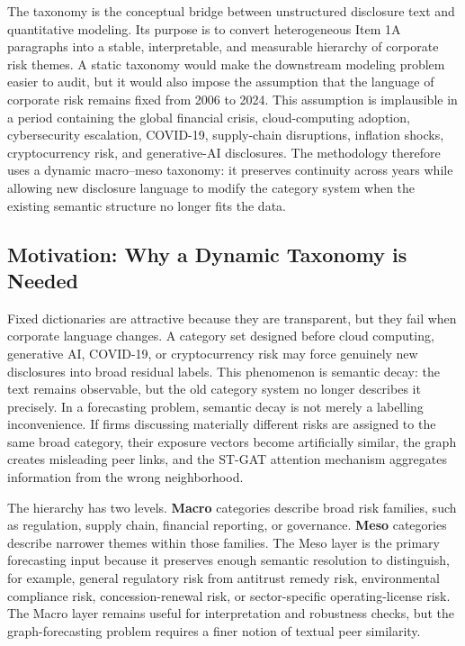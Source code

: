\documentclass[11pt, a4paper]{article}
\begin{document}
The taxonomy is the conceptual bridge between unstructured disclosure text and quantitative modeling. Its purpose is to convert heterogeneous Item 1A paragraphs into a stable, interpretable, and measurable hierarchy of corporate risk themes. A static taxonomy would make the downstream modeling problem easier to audit, but it would also impose the assumption that the language of corporate risk remains fixed from 2006 to 2024. This assumption is implausible in a period containing the global financial crisis, cloud-computing adoption, cybersecurity escalation, COVID-19, supply-chain disruptions, inflation shocks, cryptocurrency risk, and generative-AI disclosures. The methodology therefore uses a dynamic macro--meso taxonomy: it preserves continuity across years while allowing new disclosure language to modify the category system when the existing semantic structure no longer fits the data.

\subsection{Motivation: Why a Dynamic Taxonomy is Needed}
Fixed dictionaries are attractive because they are transparent, but they fail when corporate language changes. A category set designed before cloud computing, generative AI, COVID-19, or cryptocurrency risk may force genuinely new disclosures into broad residual labels. This phenomenon is semantic decay: the text remains observable, but the old category system no longer describes it precisely. In a forecasting problem, semantic decay is not merely a labelling inconvenience. If firms discussing materially different risks are assigned to the same broad category, their exposure vectors become artificially similar, the graph creates misleading peer links, and the ST-GAT attention mechanism aggregates information from the wrong neighborhood.

The hierarchy has two levels. \textbf{Macro} categories describe broad risk families, such as regulation, supply chain, financial reporting, or governance. \textbf{Meso} categories describe narrower themes within those families. The Meso layer is the primary forecasting input because it preserves enough semantic resolution to distinguish, for example, general regulatory risk from antitrust remedy risk, environmental compliance risk, concession-renewal risk, or sector-specific operating-license risk. The Macro layer remains useful for interpretation and robustness checks, but the graph-forecasting problem requires a finer notion of textual peer similarity.
\end{document}
